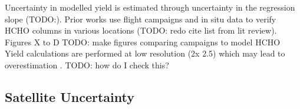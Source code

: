     Uncertainty in modelled yield is estimated through uncertainty in the regression slope (TODO:).
    Prior works use flight campaigns and in situ data to verify HCHO columns in various locations (TODO: redo cite list from lit review).
    Figures X to D TODO: make figures comparing campaigns to model HCHO
    Yield calculations are performed at low resolution (2\degr x 2.5\degr) which may lead to overestimation \parencite{Yu2016}.
    TODO: how do I check this?
    
  \subsection{Satellite Uncertainty}
    \label{BioIsop:Uncertianty:Satellite}
    
